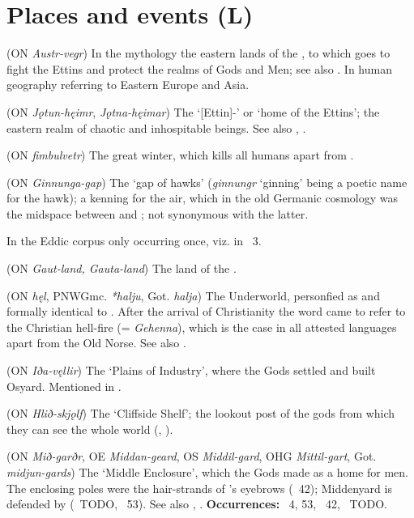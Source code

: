 \section{Places and events (L)}
\begin{itemize}

 (ON \emph{Austr-vegr})
  In the mythology the eastern lands of the , to which  goes to fight the Ettins and protect the realms of Gods and Men; see also .  In human geography referring to Eastern Europe and Asia.

 (ON \emph{Jǫtun-hęimr}, \emph{Jǫtna-hęimar})
  The ‘[Ettin]-’ or ‘home of the Ettins’; the eastern realm of chaotic and inhospitable beings.  See also , .

 (ON \emph{fimbulvetr})
  The great winter, which kills all humans apart from .

 (ON \emph{Ginnunga-gap})
  The ‘gap of hawks’ (\emph{ginnungr} ‘ginning’ being a poetic name for the hawk); a kenning for the air, which in the old Germanic cosmology was the midspace between  and ; not synonymous with the latter.

  In the Eddic corpus only occurring once, viz. in \Voluspa\ 3.

 (ON \emph{Gaut-land, Gauta-land})
  The land of the .

 (ON \emph{hęl}, PNWGmc. \emph{*halju}, Got. \emph{halja})
  The Underworld, personfied as and formally identical to .  After the arrival of Christianity the word came to refer to the Christian hell-fire (= \emph{Gehenna}), which is the case in all attested languages apart from the Old Norse.  See also .

 (ON \emph{Iða-vęllir})
  The ‘Plains of Industry’, where the Gods settled and built Osyard.  Mentioned in \Voluspa.

 (ON \emph{Hlið-skjǫlf})
  The ‘Cliffside Shelf’; the lookout post of the gods from which they can see the whole world (\Grimnismal, \Skirnismal).

 (ON \emph{Mið-garðr}, OE \emph{Middan-geard}, OS \emph{Middil-gard}, OHG \emph{Mittil-gart}, Got. \emph{midjun-gards})
  The ‘Middle Enclosure’, which the Gods made as a home for men.  The enclosing poles were the hair-strands of ’s eyebrows (\Grimnismal\ 42); Middenyard is defended by  (\Harbardsljod\ TODO, \Voluspa\ 53).  See also , .
  \textbf{Occurrences:} \Voluspa\ 4, 53, \Grimnismal\ 42, \Harbardsljod\ TODO.


\end{itemize}
